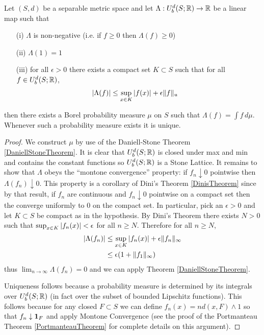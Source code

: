 \begin{lem}\label{StoneDaniellProbability}Let $(S,d)$ be a separable metric space and let $\Lambda :
  U_b^d(S; \mathbb{R}) \to \mathbb{R}$ be a linear map such that 
\begin{itemize}
\item[(i)] $\Lambda$ is non-negative (i.e. if
  $f \geq 0$ then $\Lambda(f) \geq 0$) 
\item[(ii)] $\Lambda(1) = 1$
\item[(iii)] for all $\epsilon > 0$ there exists a compact set $K
  \subset S$ such that for all $f \in U_b^d(S; \mathbb{R})$,
\begin{align*}
\left \vert \Lambda(f) \right \vert &\leq \sup_{x \in K} \left \vert f(x) \right \vert + \epsilon \lVert f \rVert_u
\end{align*}
\end{itemize}
then there exists a Borel probability measure $\mu$ on $S$ such that
$\Lambda(f) = \int f \, d\mu$.  Whenever such a probability measure
exists it is unique.
\end{lem}
\begin{proof}
We construct $\mu$ by use of the Daniell-Stone Theorem
\ref{DaniellStoneTheorem}.  It is clear that $U_b^d(S; \mathbb{R})$ is
closed under max and min and contains the constant functions so
$U_b^d(S; \mathbb{R})$ is a Stone Lattice.  It remains to show that
$\Lambda$ obeys the ``montone convergence'' property: if $f_n
\downarrow 0$ pointwise then $\Lambda(f_n) \downarrow 0$.  This
property is a corollary of Dini's Theorem \ref{DinisTheorem} since by that result,
if $f_n$ are continuous and $f_n \downarrow 0$ pointwise on a compact
set then the converge uniformly to $0$ on the compact set.  In
particular, pick an $\epsilon > 0$ and let $K \subset S$ be compact
as in the hypothesis.  By Dini's Theorem there exists $N > 0$ such
that $\sup_{x \in K} \left \vert f_n(x) \right \vert < \epsilon$ for all $n \geq N$.  Therefore
for all $n \geq N$,
\begin{align*}
\left \vert \Lambda(f_n) \right \vert &\leq \sup_{x \in K} \left \vert f_n(x) \right \vert + \epsilon
\lVert f_n \rVert_\infty \\
&\leq \epsilon(1 + \lVert f_1 \rVert_\infty)
\end{align*}
thus $\lim_{n \to \infty} \Lambda(f_n) = 0$ and we can apply Theorem \ref{DaniellStoneTheorem}. 

Uniqueness follows because a probability measure is determined by its
integrals over $U_b^d(S;\mathbb{R})$ (in fact over the subset of bounded
Lipschitz functions).  This follows because for any closed $F \subset
S$ we can define $f_n(x) = n d(x, F) \wedge 1$ so that $f_n
\downarrow \textbf{1}_{F}$ and apply Montone Convergence (see the
proof of the Portmanteau Theorem \ref{PortmanteauTheorem} for complete
details on this argument).
\end{proof}

